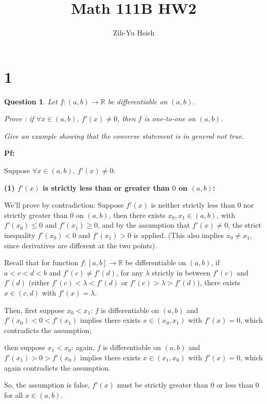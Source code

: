 \documentclass{article}
\title{Math 111B HW2}
\author{Zih-Yu Hsieh}
\newtheorem{question}{Question}
\begin{document}
\maketitle

\section*{1}
\begin{myBox}[]{}
    \begin{question}
        Let $f : (a, b) \rightarrow \mathbb{R}$ be differentiable on $(a, b)$.
        
        Prove : if $\forall x\in(a,b),\ f'(x)\neq 0$, then $f$ is one-to-one on $(a, b)$.
        
        Give an example showing that the converse statement is in general not true.     
    \end{question}
\end{myBox}


\textbf{Pf:}

Suppose $\forall x\in(a,b),\ f'(x)\neq 0$:

\hfill

\textbf{(1) $f'(x)$ is strictly less than or greater than $0$ on $(a,b)$:}

We'll prove by contradiction: Suppose $f'(x)$ is neither strictly less than $0$ nor strictly greater than $0$ on $(a,b)$,
then there exists $x_0, x_1\in (a,b)$, with $f'(x_0)\leq 0$ and $f'(x_1)\geq 0$, and by the assumption that $f'(x)\neq 0$,
the strict inequality $f'(x_0)< 0$ and $f'(x_1)> 0$ is applied. (This also implies $x_0 \neq x_1$, since derivatives are different
 at the two points).

\hfill

Recall that for function $f:[a,b]\rightarrow \mathbb{R}$ be differentiable on $(a,b)$, if $a<c<d<b$ and 
$f'(c)\neq f'(d)$, for any $\lambda$ strictly in between $f'(c)$ and $f'(d)$ (either $f'(c)<\lambda<f'(d)$ or $f'(c)>\lambda>f'(d)$),
there exists $x\in (c,d)$ with $f'(x)=\lambda$.

Then, first suppose $x_0<x_1$: $f$ is differentiable on $(a,b)$ and $f'(x_0) < 0 < f'(x_1)$ implies there exists $x\in(x_0,x_1)$ with
$f'(x)=0$, which contradicts the assumption;

then suppose $x_1<x_0$: again, $f$ is differentiable on $(a,b)$ and $f'(x_1)>0>f'(x_0)$ implies there exists $x\in (x_1,x_0)$ with
$f'(x)=0$, which again contradicts the assumption.

So, the assumption is false, $f'(x)$ must be strictly greater than $0$ or less than $0$ for all $x\in (a,b)$.
\end{document}
